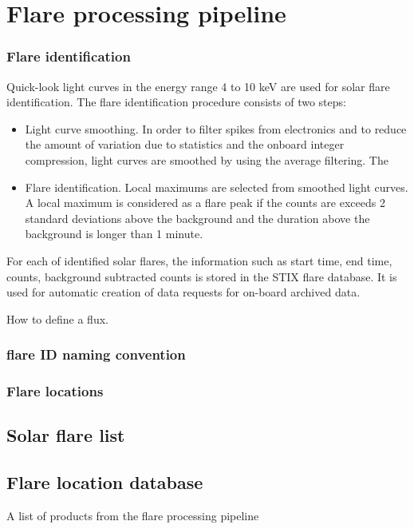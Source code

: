 \documentclass{aa}
\begin{document}
\section{Flare processing pipeline}

\subsubsection{Flare identification}
Quick-look light curves in the energy range 4 to 10 keV are used for solar flare identification.  The flare identification procedure consists of  two steps:
\begin{itemize}
\item Light curve smoothing. In order to filter spikes from electronics and to reduce the amount of variation due to statistics and the onboard integer compression, light curves are smoothed by using the average filtering. The
\item Flare identification. Local maximums are selected from smoothed light curves.  A local maximum is considered as a flare peak if the counts are exceeds 2 standard deviations above the background and the duration above the background is longer than 1 minute.
\end{itemize}

For each of identified solar flares,   the  information such as start time, end time, counts, background subtracted counts is stored in the STIX flare database.   It is used for automatic creation of data requests for on-board archived data.

How to define a flux.


\subsubsection{flare ID naming convention}
\subsubsection{Flare locations}

\subsection{Solar flare list}
\subsection{Flare location database}


A list of products from the flare processing pipeline
\end{document}
